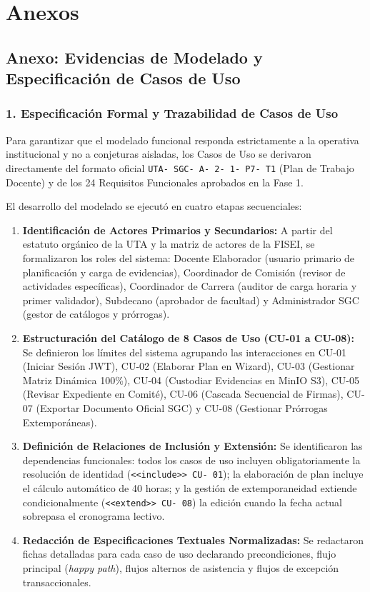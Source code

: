 \documentclass[12pt,a4paper]{article}
\begin{document}
\vspace{0.4cm}

\section{Anexos}

\subsection*{Anexo: Evidencias de Modelado y Especificación de Casos de Uso}

\subsubsection*{1. Especificación Formal y Trazabilidad de Casos de Uso}
Para garantizar que el modelado funcional responda estrictamente a la operativa institucional y no a conjeturas aisladas, los Casos de Uso se derivaron directamente del formato oficial \texttt{UTA- SGC- A- 2- 1- P7- T1} (Plan de Trabajo Docente) y de los 24 Requisitos Funcionales aprobados en la Fase 1.

El desarrollo del modelado se ejecutó en cuatro etapas secuenciales:
\begin{enumerate}[leftmargin=1.5em, itemsep=2pt]
    \item \textbf{Identificación de Actores Primarios y Secundarios:} A partir del estatuto orgánico de la UTA y la matriz de actores de la FISEI, se formalizaron los roles del sistema: Docente Elaborador (usuario primario de planificación y carga de evidencias), Coordinador de Comisión (revisor de actividades específicas), Coordinador de Carrera (auditor de carga horaria y primer validador), Subdecano (aprobador de facultad) y Administrador SGC (gestor de catálogos y prórrogas).
    \item \textbf{Estructuración del Catálogo de 8 Casos de Uso (CU-01 a CU-08):} Se definieron los límites del sistema agrupando las interacciones en CU-01 (Iniciar Sesión JWT), CU-02 (Elaborar Plan en Wizard), CU-03 (Gestionar Matriz Dinámica 100\%), CU-04 (Custodiar Evidencias en MinIO S3), CU-05 (Revisar Expediente en Comité), CU-06 (Cascada Secuencial de Firmas), CU-07 (Exportar Documento Oficial SGC) y CU-08 (Gestionar Prórrogas Extemporáneas).
    \item \textbf{Definición de Relaciones de Inclusión y Extensión:} Se identificaron las dependencias funcionales: todos los casos de uso incluyen obligatoriamente la resolución de identidad (\texttt{<<include>> CU- 01}); la elaboración de plan incluye el cálculo automático de 40 horas; y la gestión de extemporaneidad extiende condicionalmente (\texttt{<<extend>> CU- 08}) la edición cuando la fecha actual sobrepasa el cronograma lectivo.
    \item \textbf{Redacción de Especificaciones Textuales Normalizadas:} Se redactaron fichas detalladas para cada caso de uso declarando precondiciones, flujo principal (\textit{happy path}), flujos alternos de asistencia y flujos de excepción transaccionales.
\end{enumerate}
\end{document}
